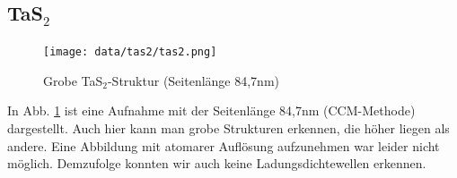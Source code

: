 \subsection{TaS$_2$}
\begin{figure}
\centering
\texttt{[image: data/tas2/tas2.png]}
\caption{Grobe TaS$_2$-Struktur (Seitenlänge 84,7nm)}
\label{fig:tas2}
\end{figure}
In Abb. \ref{fig:tas2} ist eine Aufnahme mit der Seitenlänge 84,7nm (CCM-Methode) dargestellt. Auch hier kann man grobe Strukturen erkennen, die höher liegen als andere. Eine Abbildung mit atomarer Auflösung aufzunehmen war leider nicht möglich. Demzufolge konnten wir auch keine Ladungsdichtewellen erkennen. 